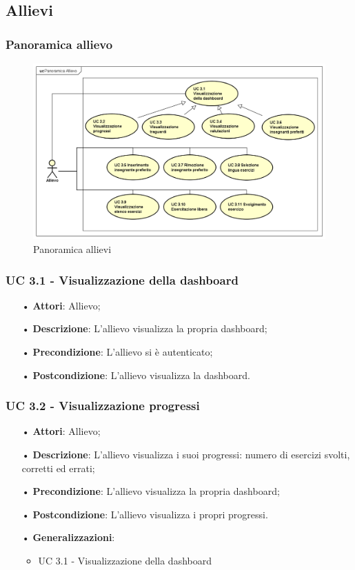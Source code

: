 \subsection{Allievi}
\subsubsection{Panoramica allievo}

\begin{figure}[H]
\centering
\includegraphics[width=17cm]{img/PanoramicaAllievi.png} 
\caption{Panoramica allievi}\label{fig:31}
\end{figure}


\subsubsection{UC 3.1 - Visualizzazione della dashboard}
\begin{itemize}
\item[•]\textbf{Attori}: Allievo;
\item[•]\textbf{Descrizione}: L'allievo visualizza la propria dashboard;
\item[•]\textbf{Precondizione}: L'allievo si è autenticato;
\item[•]\textbf{Postcondizione}: L'allievo visualizza la dashboard.
\end{itemize}

\subsubsection{UC 3.2 - Visualizzazione progressi}
\begin{itemize}
\item[•]\textbf{Attori}: Allievo;
\item[•]\textbf{Descrizione}: L'allievo visualizza i suoi progressi: numero di esercizi svolti, corretti ed errati;
\item[•]\textbf{Precondizione}: L'allievo visualizza la propria dashboard;
\item[•]\textbf{Postcondizione}: L'allievo visualizza i propri progressi.
\item[•]\textbf{Generalizzazioni}:
\begin{itemize}
\item UC 3.1 - Visualizzazione della dashboard
\end{itemize}
\end{itemize}
